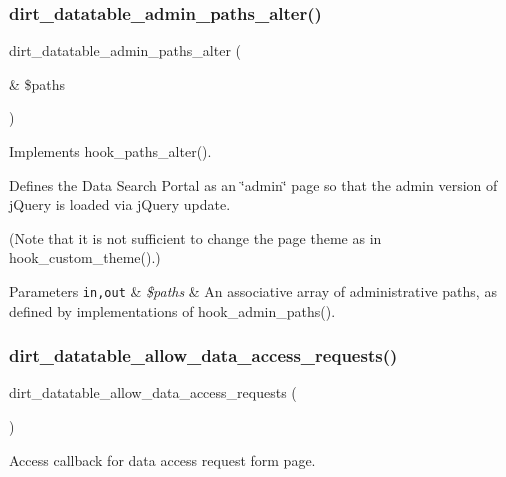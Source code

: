 \subsubsection{\texorpdfstring{dirt\+\_\+datatable\+\_\+admin\+\_\+paths\+\_\+alter()}{dirt\_datatable\_admin\_paths\_alter()}}
{\footnotesize\ttfamily dirt\+\_\+datatable\+\_\+admin\+\_\+paths\+\_\+alter (\begin{DoxyParamCaption}\item[{\&}]{\$paths }\end{DoxyParamCaption})}

Implements hook\+\_\+paths\+\_\+alter().

Defines the Data Search Portal as an \char`\"{}admin\char`\"{} page so that the admin version of j\+Query is loaded via j\+Query update.

(Note that it is not sufficient to change the page theme as in hook\+\_\+custom\+\_\+theme().)


\begin{DoxyParams}[1]{Parameters}
\mbox{\tt in,out}  & {\em \$paths} & An associative array of administrative paths, as defined by implementations of hook\+\_\+admin\+\_\+paths(). \\
\hline
\end{DoxyParams}
\mbox{\label{dirt__datatable_8module_abd4284f36dd119f3def0fa10a667130d}} 
\subsubsection{\texorpdfstring{dirt\+\_\+datatable\+\_\+allow\+\_\+data\+\_\+access\+\_\+requests()}{dirt\_datatable\_allow\_data\_access\_requests()}}
{\footnotesize\ttfamily dirt\+\_\+datatable\+\_\+allow\+\_\+data\+\_\+access\+\_\+requests (\begin{DoxyParamCaption}{ }\end{DoxyParamCaption})}

Access callback for data access request form page. \mbox{\label{dirt__datatable_8module_ac057404a34dadf4fdf413e1551353053}} 
